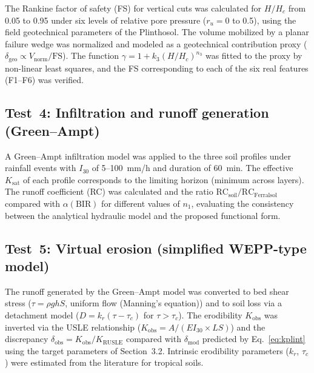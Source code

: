 \documentclass[pdflatex,sn-basic,referee,lineno]{sn-jnl}
\begin{document}
The Rankine factor of safety (FS) \citep{rankine_1857} for vertical cuts was calculated for $H/H_c$ from 0.05 to 0.95 under six levels of relative pore pressure ($r_u = 0$ to 0.5), using the field geotechnical parameters of the Plinthosol. The volume mobilized by a planar failure wedge was normalized and modeled as a geotechnical contribution proxy ($\delta_{\mathrm{geo}} \propto V_{\mathrm{norm}}/\mathrm{FS}$). The function $\gamma = 1 + k_3(H/H_c)^{n_3}$ was fitted to the proxy by non-linear least squares, and the FS corresponding to each of the six real features (F1--F6) was verified.

\subsection{Test~4: Infiltration and runoff generation (Green--Ampt)}

A Green--Ampt infiltration model \citep{green_ampt_1911} was applied to the three soil profiles under rainfall events with $I_{30}$ of 5--100~mm/h and duration of 60~min. The effective $K_{\mathrm{sat}}$ of each profile corresponds to the limiting horizon (minimum across layers). The runoff coefficient (RC) was calculated and the ratio $\mathrm{RC}_{\mathrm{soil}}/\mathrm{RC}_{\mathrm{Ferralsol}}$ compared with $\alpha(\mathrm{BIR})$ for different values of $n_1$, evaluating the consistency between the analytical hydraulic model and the proposed functional form.

\subsection{Test~5: Virtual erosion (simplified WEPP-type model)}

The runoff generated by the Green--Ampt model was converted to bed shear stress ($\tau = \rho g h S$, uniform flow (Manning's equation)) and to soil loss via a detachment model ($D = k_r(\tau - \tau_c)$ for $\tau > \tau_c$). The erodibility $K_{\mathrm{obs}}$ was inverted via the USLE relationship ($K_{\mathrm{obs}} = A/(EI_{30} \times LS)$) and the discrepancy $\delta_{\mathrm{obs}} = K_{\mathrm{obs}}/K_{\mathrm{RUSLE}}$ compared with $\delta_{\mathrm{mod}}$ predicted by Eq.~\ref{eq:kplint} using the target parameters of Section~3.2. Intrinsic erodibility parameters ($k_r$, $\tau_c$) were estimated from the literature for tropical soils.

\end{document}
